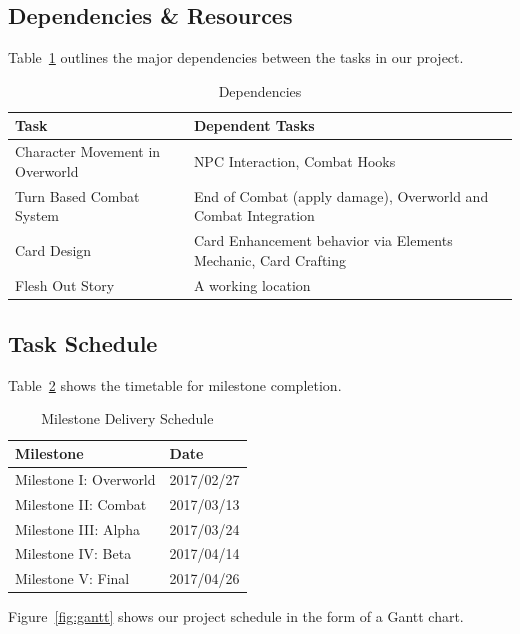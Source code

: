 \documentclass[12pt,titlepage]{article}
\begin{document}
\subsection{Dependencies \& Resources}
Table~\ref{tab:dependencies} outlines the major dependencies between the tasks
in our project.
\begin{table}[H]
    \caption{Dependencies}
    \label{tab:dependencies}
    \centering
    \begin{tabularx}{\linewidth}{|l|X|}
        \hline
        \textbf{Task} & \textbf{Dependent Tasks} \\
        \hline
        Character Movement in Overworld & NPC Interaction, Combat Hooks \\
        \hline
        Turn Based Combat System & End of Combat (apply damage), Overworld and
        Combat Integration \\
        \hline
        Card Design & Card Enhancement behavior via Elements Mechanic, Card Crafting \\
        \hline
        Flesh Out Story & A working location \\
        \hline
    \end{tabularx}
\end{table}

\subsection{Task Schedule}
Table~\ref{tab:schedule} shows the timetable for milestone completion.
\begin{table}[H]
    \caption{Milestone Delivery Schedule}
    \label{tab:schedule}
    \centering
    \begin{tabular}{|l|l|}
        \hline
        \textbf{Milestone} & \textbf{Date} \\
        \hline
        Milestone I: Overworld & 2017/02/27 \\
        \hline
        Milestone II: Combat & 2017/03/13 \\
        \hline
        Milestone III: Alpha & 2017/03/24 \\
        \hline
        Milestone IV: Beta & 2017/04/14 \\
        \hline
        Milestone V: Final & 2017/04/26 \\
        \hline
    \end{tabular}
\end{table}

Figure~\ref{fig:gantt} shows our project schedule in the form of a Gantt chart.
\end{document}
